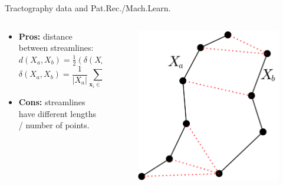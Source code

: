 \documentclass{beamer}
\begin{document}
\begin{frame}{Tractography data and Pat.Rec./Mach.Learn.}
  \begin{columns}
    \begin{column}{0.65\linewidth}
      \begin{itemize}
      \item \textbf{Pros:} distance~\cite{zhang2008identifying}
        between streamlines: $d(X_a,X_b) = \frac{1}{2}(\delta(X_a,X_b)
        + \delta(X_b,X_a))$
        \begin{equation*}
          \delta(X_a,X_b) = \frac{1}{|X_a|} \sum_{\mathbf{x}_i \in X_a}
          \min_{\mathbf{y} \in X_b} ||\mathbf{x}_i - \mathbf{y}||_2.
        \end{equation*}
      \item \textbf{Cons:} streamlines have different lengths / number
        of points.
      \end{itemize}
    \end{column}
    \begin{column}{0.4\linewidth}
      \begin{figure}
        \centering
        \includegraphics[width=0.8\linewidth]{streamline_structural_distance}

\end{figure}
\end{column}
\end{columns}
\end{frame}
\end{document}

